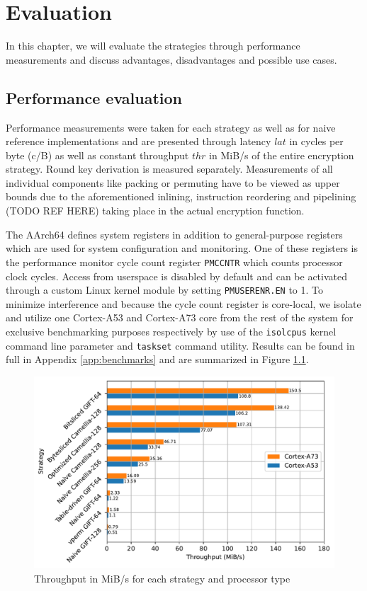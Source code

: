 \chapter{Evaluation}

In this chapter, we will evaluate the strategies through performance
measurements and discuss advantages, disadvantages and possible use cases.

\section{Performance evaluation}

Performance measurements were taken for each strategy as well as for naive
reference implementations and are presented through latency $lat$ in cycles per
byte (c/B) as well as constant throughput $thr$ in MiB/s of the entire
encryption strategy. Round key derivation is measured separately. Measurements
of all individual components like packing or permuting have to be viewed as
upper bounds due to the aforementioned inlining, instruction reordering and
pipelining (TODO REF HERE) taking place in the actual encryption function.

The AArch64 defines system registers in addition to general-purpose registers
which are used for system configuration and monitoring. One of these registers
is the performance monitor cycle count register \texttt{PMCCNTR} which counts
processor clock cycles. Access from userspace is disabled by default and can be
activated through a custom Linux kernel module by setting \texttt{PMUSERENR.EN}
to 1. To minimize interference and because the cycle count register is
core-local, we isolate and utilize one Cortex-A53 and Cortex-A73 core from the
rest of the system for exclusive benchmarking purposes respectively by use of
the \texttt{isolcpus} kernel command line parameter and \texttt{taskset}
command utility. Results can be found in full in Appendix \ref{app:benchmarks}
and are summarized in Figure \ref{figure:benchmark}.

\begin{figure}[h!]
    \centering
    \includegraphics[width=\textwidth]{Figures/benchmark_plot.pdf}
    \caption{Throughput in MiB/s for each strategy and processor type}
    \label{figure:benchmark}
\end{figure}

